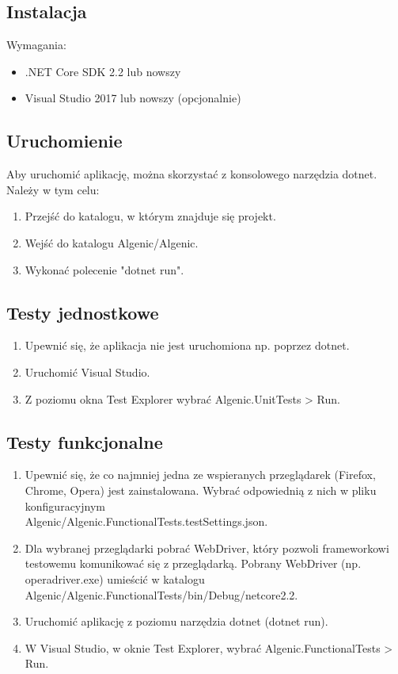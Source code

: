 \documentclass{article}
\begin{document}
\subsection{Instalacja}
Wymagania:
\begin{itemize}
    \item .NET Core SDK 2.2 lub nowszy
    \item Visual Studio 2017 lub nowszy (opcjonalnie)
\end{itemize}

\subsection{Uruchomienie}
Aby uruchomić aplikację, można skorzystać z konsolowego narzędzia dotnet. Należy w tym celu:
\begin{enumerate}
    \item Przejść do katalogu, w którym znajduje się projekt.
    \item Wejść do katalogu Algenic/Algenic.
    \item Wykonać polecenie "dotnet run".
\end{enumerate}

\subsection{Testy jednostkowe}
\begin{enumerate}
    \item Upewnić się, że aplikacja nie jest uruchomiona np. poprzez dotnet.
    \item Uruchomić Visual Studio.
    \item Z poziomu okna Test Explorer wybrać Algenic.UnitTests > Run.
\end{enumerate}

\subsection{Testy funkcjonalne}
\begin{enumerate}
    \item Upewnić się, że co najmniej jedna ze wspieranych przeglądarek (Firefox, Chrome, Opera) jest zainstalowana. Wybrać odpowiednią z nich w pliku konfiguracyjnym\\Algenic/Algenic.FunctionalTests.testSettings.json.
    \item Dla wybranej przeglądarki pobrać WebDriver, który pozwoli frameworkowi testowemu komunikować się z przeglądarką. Pobrany WebDriver (np. operadriver.exe) umieścić w katalogu Algenic/Algenic.FunctionalTests/bin/Debug/netcore2.2.
    \item Uruchomić aplikację z poziomu narzędzia dotnet (dotnet run).
    \item W Visual Studio, w oknie Test Explorer, wybrać Algenic.FunctionalTests > Run.
\end{enumerate}
\end{document}
